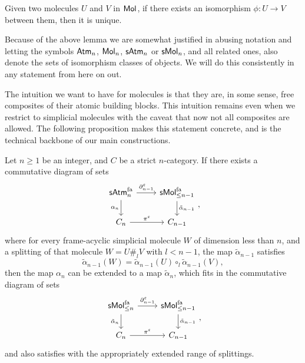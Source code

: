 \documentclass[12pt,a4paper]{article}
\numberwithin{equation}{section}
\newcommand{\atm}[2][s]{%
    \ifx b#1\mathsf{Atm}_{#2}\else
    \ifx s#1\mathsf{sAtm}_{#2}\else
    \ifx f#1\mathsf{sAtm}^{\mathrm{fa}}_{#2}\else
    \mathrm{Illegal~option}%
    \fi\fi\fi
}
\newcommand{\mol}[2][s]{%
    \ifx b#1\mathsf{Mol}_{#2}\else
    \ifx s#1\mathsf{sMol}_{#2}\else
    \ifx f#1\mathsf{sMol}^{\mathrm{fa}}_{#2}\else
    \mathrm{Illegal~option}%
    \fi\fi\fi
}
\begin{document}
\begin{lemma}
    Given two molecules $U$ and $V$ in $\mol[b]{}$, if there exists an isomorphism $\phi: U \to V$ between them, then it is unique.
\end{lemma}

\begin{remark}
    Because of the above lemma we are somewhat justified in abusing notation and letting the symbols $\atm[b]{n}$, $\mol[b]{n}$, $\atm{n}$ or $\mol{n}$, and all related ones, also denote the sets of isomorphism classes of objects. We will do this consistently in any statement from here on out.
\end{remark}


The intuition we want to have for molecules is that they are, in some sense, free composites of their atomic building blocks. This intuition remains even when we restrict to simplicial molecules with the caveat that now not all composites are allowed. The following proposition makes this statement concrete, and is the technical backbone of our main constructions.

\begin{proposition}\label{prop:extend_atoms_to_molecules}
    Let $n \geq 1$ be an integer, and $C$ be a strict $n$-category. If there exists a commutative diagram of sets
    \begin{equation}
        \begin{tikzcd}
            \atm[f]{n} \arrow[r, "\partial^\varepsilon_{n-1}"] \arrow[d, "\alpha_n"'] & \mol[f]{\leq n - 1} \arrow[d, "\tilde{\alpha}_{n-1}"] \\
            C_n \arrow[r, "\pi^\varepsilon"] & C_{n-1}
        \end{tikzcd},
    \end{equation}
    where for every frame-acyclic simplicial molecule $W$ of dimension less than $n$, and a splitting of that molecule $W = U \#_l V$ with $l < n - 1$, the map $\tilde{\alpha}_{n-1}$ satisfies
    \begin{equation}\label{eq:compositionality_of_extension}
        \tilde{\alpha}_{n-1}(W) = \tilde{\alpha}_{n-1}(U) \circ_l \tilde{\alpha}_{n-1}(V),
    \end{equation}
    then the map $\alpha_n$ can be extended to a map $\tilde{\alpha}_n$, which fits in the commutative diagram of sets
    \begin{equation}
        \begin{tikzcd}
            \mol[f]{\leq n} \arrow[r, "\partial^\varepsilon_{n-1}"] \arrow[d, "\tilde{\alpha}_n"'] & \mol[f]{\leq n - 1} \arrow[d, "\tilde{\alpha}_{n-1}"] \\
            C_n \arrow[r, "\pi^\varepsilon"] & C_{n-1}
        \end{tikzcd},
    \end{equation}
    and also satisfies  with the appropriately extended range of splittings.
\end{proposition}
\end{document}
